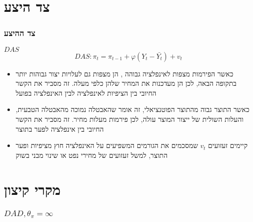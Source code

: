 \documentclass[usenames,dvipsnames]{beamer}
\newcommand{\heart}{\ensuremath\heartsuit}
\begin{document}
\begin{RTL}
\section{צד היצע}
\begin{frame}
    \frametitle{צד ההיצע}
    \begin{block}{$DAS$}
    $$DAS : \pi_t = \pi_{t-1} + \varphi \left(Y_t - \bar{Y_t}\right) + v_t $$
        \begin{itemize}
            \item כאשר הפירמות מצפות לאינפלציה גבוהה , הן מצפות גם לעלויות יצור גבוהות יותר בתקופה הבאה, לכן הן מעדכנות את המחיר שלהן כלפי מעלה. זה מסביר את הקשר החיובי בין הציפיות לאינפלציה לבין האינפלציה בפועל
            \item כאשר התוצר גבוה מהתוצר הפוטנציאלי, זה אומר שהאבטלה נמוכה מהאבטלה הטבעית, והעלות השולית של ייצור המוצר עולה, לכן פירמות מעלות מחיר. זה מסביר את הקשר החיובי בין אינפלציה לפער בתוצר
            \item קיימים זעזועים $v_t$ שמסכמים את הגורמים המשפיעים על האינפלציה חוץ מציפיות ופער התוצר, למשל זעזועים של מחירי נפט או שינוי מבני בשוק
        \end{itemize}
    \end{block}


\end{frame}

\section{מקרי קיצון}
\begin{frame}
    \frametitle{$DAD, \theta_\pi = \infty$}
    \begin{center}
\end{center}
\end{frame}
\end{RTL}
\end{document}
